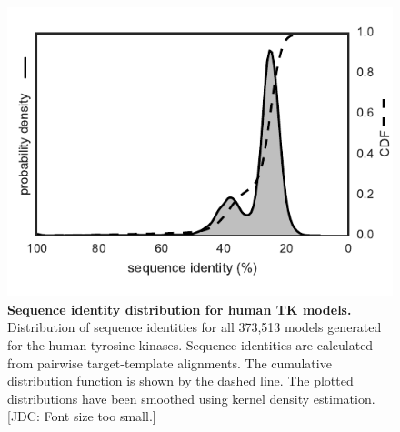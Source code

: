 \documentclass[aps,pre,twocolumn,nofootinbib,superscriptaddress,linenumbers]{revtex4-1}
\begin{document}

\begin{figure}[tb]
    \includegraphics[width=1.0\columnwidth]{seqid_dist/seqid_dist}

    \caption{{\bf Sequence identity distribution for human TK models.}
    Distribution of sequence identities for all 373,513 models generated for the human tyrosine kinases.
    Sequence identities are calculated from pairwise target-template alignments.
    The cumulative distribution function is shown by the dashed line.
    The plotted distributions have been smoothed using kernel density estimation.
    {\color{red}[JDC: Font size too small.]}
    }
  \label{figure:sequence-identity-distribution}
\end{figure}

\end{document}
